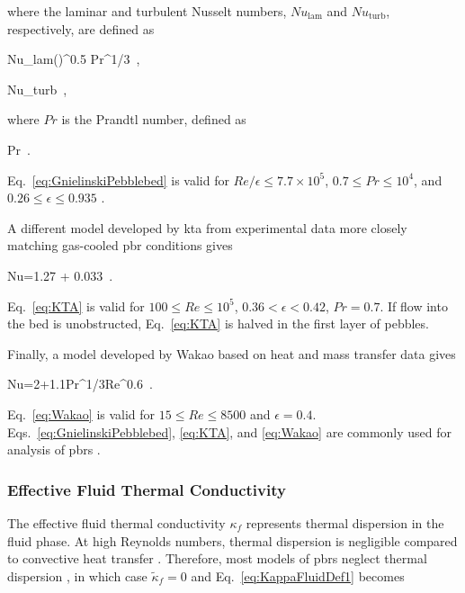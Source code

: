\noindent where the laminar and turbulent Nusselt numbers, \(Nu_\text{lam}\) and \(Nu_\text{turb}\), respectively, are defined as

\beq
\label{eq:NuLam}
Nu_{\textrm{lam}}\left(\right)^{0.5} Pr^{1/3}\ ,
\eeq

\beq
\label{eq:NuTurb}
Nu_{\textrm{turb}}\equiv{}\ ,
\eeq

\noindent where \(Pr\) is the Prandtl number, defined as

\beq
\label{eq:Prandtl}
Pr\equiv{}\ .
\eeq

\noindent Eq.\ \eqref{eq:GnielinskiPebblebed} is valid for \(Re/\epsilon \leq 7.7\times 10^5\), \(0.7\leq Pr\leq 10^4\), and \(0.26\leq\epsilon\leq 0.935\) \cite{achenbach}. 

A different model developed by \gls{kta} from experimental data more closely matching gas-cooled \gls{pbr} conditions gives \cite{KTAhtc}

\beq
\label{eq:KTA}
Nu=1.27  + 0.033\ .
\eeq

\noindent Eq.\ \eqref{eq:KTA} is valid for \(100 \leq Re \leq 10^5\), \(0.36< \epsilon< 0.42\), \(Pr=0.7\). If flow into the bed is unobstructed, Eq.\ \eqref{eq:KTA} is halved in the first layer of pebbles.

Finally, a model developed by Wakao based on heat and mass transfer data gives \cite{wakao}

\beq
\label{eq:Wakao}
Nu=2+1.1Pr^{1/3}Re^{0.6}\ .
\eeq

\noindent Eq.\ \eqref{eq:Wakao} is valid for \(15\leq Re\leq8500\) and \(\epsilon=0.4\). Eqs.\ \eqref{eq:GnielinskiPebblebed}, \eqref{eq:KTA}, and \eqref{eq:Wakao} are commonly used for analysis of \glspl{pbr} \cite{auwerda_2011, becker, becker2003,avigni,gao, suikkanen,scarlat,y_li,xin_wang_thesis,cai}.

\subsubsection{Effective Fluid Thermal Conductivity}
\label{sec:Kappa}

The effective fluid thermal conductivity \(\kappa_f\) represents thermal dispersion in the fluid phase. At high Reynolds numbers, thermal dispersion is negligible compared to convective heat transfer \cite{gunn1987_htc,littman}. Therefore, most models of \glspl{pbr} neglect thermal dispersion \cite{suikkanen,y_li}, in which case \(\tilde{\kappa}_f=0\) and Eq.\ \eqref{eq:KappaFluidDef1} becomes

